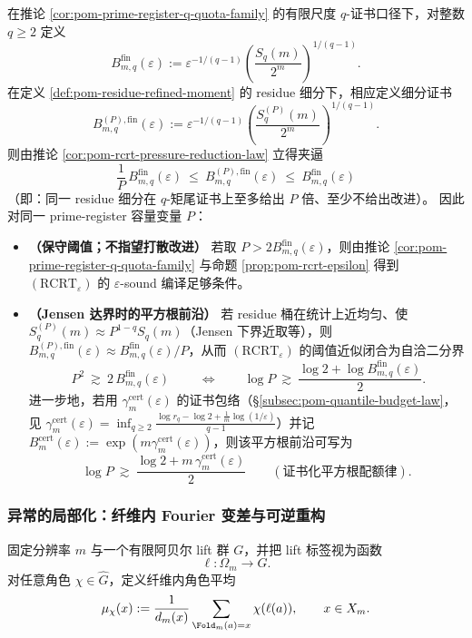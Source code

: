 \begin{corollary}\label{cor:pom-rcrt-self-consistent-sqrt-budget}
在推论 \ref{cor:pom-prime-register-q-quota-family} 的有限尺度 \(q\)-证书口径下，对整数 \(q\ge 2\) 定义
\[
B_{m,q}^{\mathrm{fin}}(\varepsilon)
:=\varepsilon^{-1/(q-1)}\left(\frac{S_q(m)}{2^m}\right)^{\!1/(q-1)}.
\]
在定义 \ref{def:pom-residue-refined-moment} 的 residue 细分下，相应定义细分证书
\[
B_{m,q}^{(P),\mathrm{fin}}(\varepsilon)
:=\varepsilon^{-1/(q-1)}\left(\frac{S_q^{(P)}(m)}{2^m}\right)^{\!1/(q-1)}.
\]
则由推论 \ref{cor:pom-rcrt-pressure-reduction-law} 立得夹逼
\[
\boxed{\;
\frac{1}{P}\,B_{m,q}^{\mathrm{fin}}(\varepsilon)
\ \le\
B_{m,q}^{(P),\mathrm{fin}}(\varepsilon)
\ \le\
B_{m,q}^{\mathrm{fin}}(\varepsilon)\;}
\]
（即：同一 residue 细分在 \(q\)-矩尾证书上至多给出 \(P\) 倍、至少不给出改进）。
因此对同一 prime-register 容量变量 \(P\)：
\begin{itemize}
  \item \textbf{（保守阈值；不指望打散改进）} 若取 \(P>2B_{m,q}^{\mathrm{fin}}(\varepsilon)\)，则由推论 \ref{cor:pom-prime-register-q-quota-family} 与命题 \ref{prop:pom-rcrt-epsilon} 得到 \((\mathrm{RCRT}_\varepsilon)\) 的 \(\varepsilon\)-sound 编译足够条件。
  \item \textbf{（Jensen 达界时的平方根前沿）} 若 residue 桶在统计上近均匀、使 \(S_q^{(P)}(m)\approx P^{1-q}S_q(m)\)（Jensen 下界近取等），则 \(B_{m,q}^{(P),\mathrm{fin}}(\varepsilon)\approx B_{m,q}^{\mathrm{fin}}(\varepsilon)/P\)，从而 \((\mathrm{RCRT}_\varepsilon)\) 的阈值近似闭合为自洽二分界
  \[
  \boxed{\;
  P^2\ \gtrsim\ 2\,B_{m,q}^{\mathrm{fin}}(\varepsilon)\;}
  \qquad
  \Longleftrightarrow
  \qquad
  \log P\ \gtrsim\ \frac{\log 2+\log B_{m,q}^{\mathrm{fin}}(\varepsilon)}{2}.
  \]
  进一步地，若用 \(\gamma_m^{\mathrm{cert}}(\varepsilon)\) 的证书包络（\S\ref{subsec:pom-quantile-budget-law}，见 \(\gamma_m^{\mathrm{cert}}(\varepsilon)=\inf_{q\ge 2}\frac{\log r_q-\log 2+\frac{1}{m}\log(1/\varepsilon)}{q-1}\)）并记 \(B_m^{\mathrm{cert}}(\varepsilon):=\exp(m\gamma_m^{\mathrm{cert}}(\varepsilon))\)，则该平方根前沿可写为
  \[
  \boxed{\;
  \log P\ \gtrsim\ \frac{\log 2+m\,\gamma_m^{\mathrm{cert}}(\varepsilon)}{2}
  \qquad(\text{证书化平方根配额律}).\;}
  \]
\end{itemize}
\end{corollary}

\subsubsection{异常的局部化：纤维内 Fourier 变差与可逆重构}\label{subsec:pom-anom-localization-fourier}
\begin{definition}\label{def:pom-fiber-fourier-coeff}
固定分辨率 \(m\) 与一个有限阿贝尔 lift 群 \(G\)，并把 lift 标签视为函数
$$
\ell:\Omega_m\to G.
$$
对任意角色 \(\chi\in\widehat G\)，定义纤维内角色平均
$$
\mu_\chi(x):=\frac{1}{d_m(x)}\sum_{\Fold_m(a)=x}\chi(\ell(a)),
\qquad x\in X_m.
$$
\end{definition}

